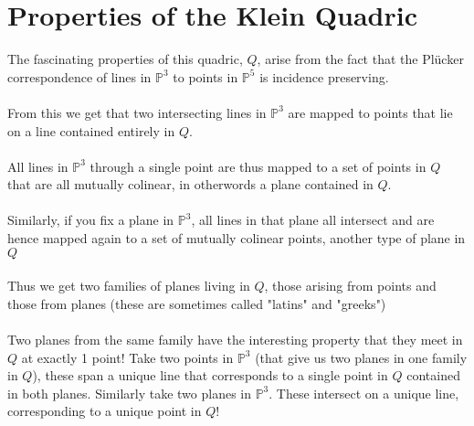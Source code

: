 \documentclass{article}
\begin{document}
\section{Properties of the Klein Quadric}

The fascinating properties of this quadric, $Q$, arise from the fact that the Pl\"ucker correspondence of lines in $\mathbb{P}^3$ to points in $\mathbb{P}^5$ is incidence preserving. \\
\\
From this we get that two intersecting lines in $\mathbb{P}^3$ are mapped to points that lie on a line contained entirely in $Q$.\\
\\
All lines in $\mathbb{P}^3$ through a single point are thus mapped to a set of points in $Q$ that are all mutually colinear, in otherwords a plane contained in $Q$.\\
\\
Similarly, if you fix a plane in $\mathbb{P}^3$, all lines in that plane all intersect and are hence mapped again to a set of mutually colinear points, another type of plane in $Q$\\
\\
Thus we get two families of planes living in $Q$, those arising from points and those from planes (these are sometimes called "latins" and "greeks")\\
\\
Two planes from the same family have the interesting property that they meet in $Q$ at exactly 1 point! Take two points in $\mathbb{P}^3$ (that give us two planes in one family in $Q$), these span a unique line that corresponds to a single point in $Q$ contained in both planes. Similarly take two planes in $\mathbb{P}^3$. These intersect on a unique line, corresponding to a unique point in $Q$!
\end{document}
